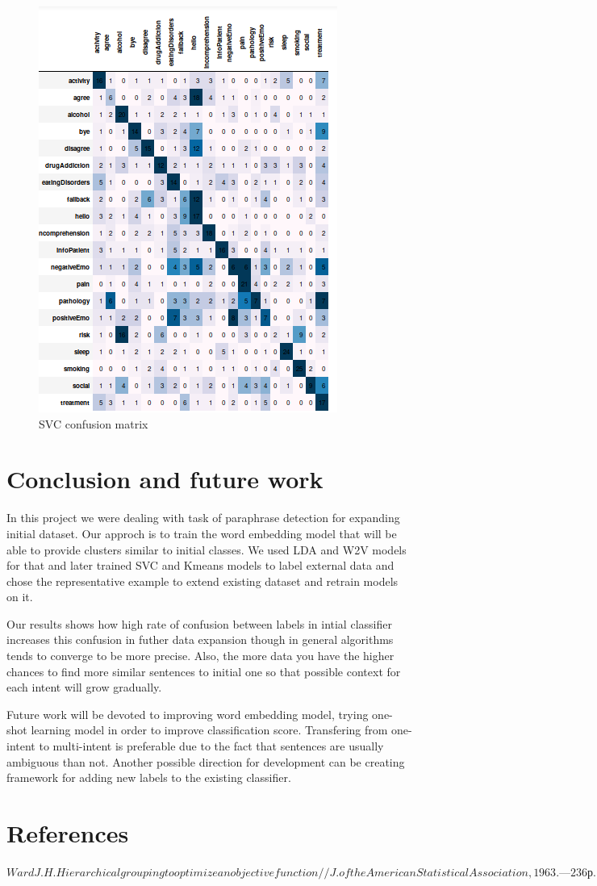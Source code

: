 \documentclass[11pt]{article}
\begin{document}
\begin{figure}[h]
	\includegraphics[scale=0.25]{svc2_cm.png}
	\caption{SVC confusion matrix}
\label{lda_gm_cm}
\end{figure}
\FloatBarrier


\section{Conclusion and future work}
\label{sec:conclusion}

In this project we were dealing with task of paraphrase detection for expanding initial dataset. Our approch is to train the word embedding model that will be able to provide clusters similar to initial classes. We used LDA and W2V models for that and later trained SVC and Kmeans models to label external data and chose the representative example to extend existing dataset and retrain models on it.

Our results shows how high rate of confusion between labels in intial classifier increases this confusion in futher data expansion though in general algorithms tends to converge to be more precise. Also, the more data you have the higher chances to find more similar sentences to initial one so that possible context for each intent will grow gradually.

Future work will be devoted to improving word embedding model, trying one-shot learning model in order to improve classification score. Transfering from one-intent to multi-intent is preferable due to the fact that sentences are usually ambiguous than not. Another possible direction for development can be creating framework for adding new labels to the existing classifier.

\section{References}


$ Ward J.H. Hierarchical grouping to optimize an objective function // J. of the American Statistical Association, 1963. — 236 р. $
\end{document}
